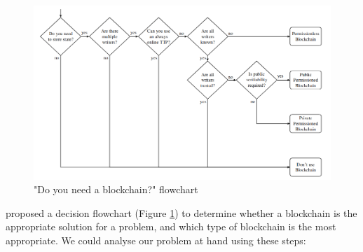 \begin{figure}[!ht] 
    \centering    
    \includegraphics[width=1.0\textwidth]{blockchain_need}
    \caption["Do you need a blockchain?" flowchart]
        {"Do you need a blockchain?" flowchart \citep[p.3]{wust2017you}}
    \label{fig:blockchain_need}
\end{figure}

\citet[p.3]{wust2017you} proposed a decision flowchart (Figure \ref{fig:blockchain_need}) to determine whether a blockchain is 
the appropriate solution for a problem, and which type of blockchain is the most appropriate. We could analyse our problem at 
hand using these steps:

